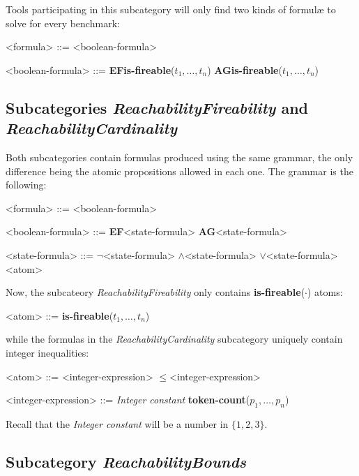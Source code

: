 \documentclass[10pt,english,a4paper]{article}
\newcommand\set[1]           {{\{ #1 \mathclose \}}}
\newcommand\ctla             {\textbf{A}\xspace}
\newcommand\ctle             {\textbf{E}\xspace}
\newcommand\ltlf             {\textbf{F}\xspace}
\newcommand\ltlg             {\textbf{G}\xspace}
\newcommand\logicnot         {\boldmath$\lnot$\xspace}
\newcommand\logicand         {\boldmath$\land$\xspace}
\newcommand\logicor          {\boldmath$\lor$\xspace}
\newcommand\atomleq          {\boldmath$\leq$\xspace}
\newcommand\atomisfire[1]    {\textbf{is-fireable}(#1)}
\newcommand\atomtokenscnt[1] {\textbf{token-count}(#1)}
\begin{document}
Tools participating in this subcategory will only find two kinds of
formul\ae{} to solve for every benchmark:

\begin{grammar}

<formula> ::= <boolean-formula> 

<boolean-formula> ::= \ctle \ltlf \atomisfire{$t_1, \ldots, t_n$}
\alt \ctla \ltlg \atomisfire{$t_1, \ldots, t_n$}

\end{grammar}

\subsection{Subcategories \textit{ReachabilityFireability} and \textit{ReachabilityCardinality}}

Both subcategories contain formulas produced using the same grammar, the
only difference being the atomic propositions allowed in each one.
The grammar is the following:

\begin{grammar}
<formula> ::= <boolean-formula>

<boolean-formula> ::= \ctle \ltlf <state-formula>
\alt \ctla \ltlg <state-formula>

<state-formula> ::=  \logicnot  <state-formula>
 \logicand <state-formula>
 \logicor  <state-formula>
\alt <atom>
\end{grammar}

Now, the subcateory \emph{ReachabilityFireability} only contains
\atomisfire{$\cdot$} atoms:

\begin{grammar}
<atom> ::= \atomisfire{$t_1, \ldots, t_n$}
\end{grammar}

while the formulas in the \emph{ReachabilityCardinality} subcategory
uniquely contain integer inequalities:

\begin{grammar}
<atom> ::= <integer-expression> \atomleq <integer-expression>

<integer-expression> ::= \textit{Integer constant}
\alt \atomtokenscnt{$p_1, \ldots, p_n$}
\end{grammar}

Recall that the \textit{Integer constant} will be a number in $\set{1,2,3}$.

\subsection{Subcategory \textit{ReachabilityBounds}}
\end{document}
